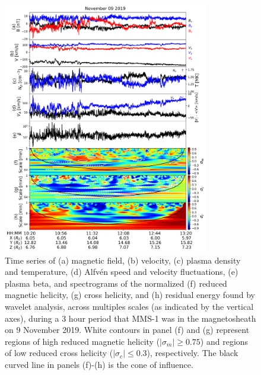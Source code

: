 \begin{figure}
    \centering
    \includegraphics[width=0.8\textwidth]{Figures/Time series/spectrograms_09112019_1020_MMS1.png}
    \caption[Time series data and spectrograms of MHD quantities for 9 November 2019]{Time series of (a) magnetic field, (b) velocity, (c) plasma density and temperature, (d) Alfv\'en speed and velocity fluctuations, (e) plasma beta, and spectrograms of the normalized (f) reduced magnetic helicity, (g) cross helicity, and (h) residual energy found by wavelet analysis, across multiples scales (as indicated by the vertical axes), during a 3 hour period that MMS-1 was in the magnetosheath on 9 November 2019. White contours in panel (f) and (g) represent regions of high reduced magnetic helicity ($|\sigma_m| \geq 0.75$) and regions of low reduced cross helicity ($|\sigma_c| \leq 0.3$), respectively. The black curved line in panels (f)-(h) is the cone of influence.}
    \label{fig:wavelet-spectrograms-mms}
\end{figure}

